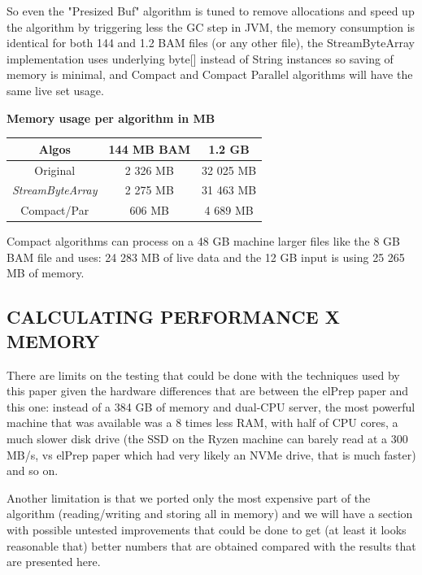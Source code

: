 \documentclass[a4paper,twoside]{article}
\begin{document}
So even the "Presized Buf" algorithm is tuned to remove allocations and speed up the algorithm by triggering less the GC step in JVM, the memory consumption is identical for both 144 and 1.2 BAM files (or any other file), the StreamByteArray implementation uses underlying byte[] instead of String instances so saving of memory is minimal, and Compact and Compact Parallel algorithms will have the same live set usage.


\begin{small}
	\par
	\textbf{Memory usage per algorithm in MB} \\
	\vspace{-0.4cm}
	\begin{center}
		\begin{tabular}{|c|c|c|}
			\hline
			Algos  	    	 	& 144 MB BAM		& 1.2 GB			\\ \hline
			Original				& 2 326 MB			& 32 025 MB			\\ \hline
			{\textit{StreamByteArray} }	& 2 275 MB			& 31 463 MB			\\ \hline
			Compact/Par				& 606 MB			& 4 689 MB			\\ \hline
		\end{tabular}
	\end{center}
\end{small}

Compact algorithms can process on a 48 GB machine larger files like the 8 GB BAM file and uses:
24 283 MB of live data and the 12 GB input is using 25 265 MB of memory.

\subsection{\uppercase{Calculating performance x memory}}\label{subsec:uppercase7}
There are limits on the testing that could be done with the techniques used by this paper given the hardware differences that are between the elPrep paper and this one: instead of a 384 GB of memory and dual-CPU server,
the most powerful machine that was available was a 8 times less RAM, with half of CPU cores, a much
slower disk drive (the SSD on the Ryzen machine can barely read at a 300 MB/s, vs elPrep paper which had
very likely an NVMe drive, that is much faster) and so on.

Another limitation is that we ported only the most expensive part of the algorithm (reading/writing and storing all in memory) and we will have a section with possible untested improvements that could be done
to get (at least it looks reasonable that) better numbers that are obtained compared with the results that are presented here.
\end{document}
